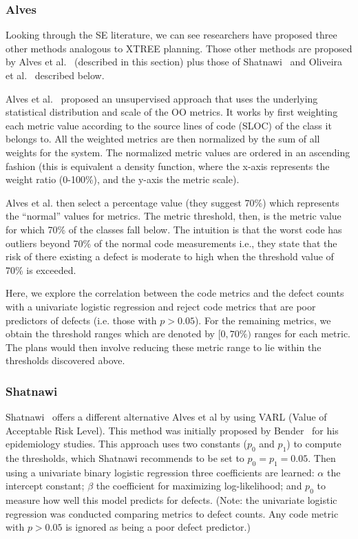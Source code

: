 \documentclass[smallextended]{svjour3}       %
\begin{document}
\subsubsection{Alves}

Looking through the SE literature, we can see researchers have proposed three other methods  analogous to XTREE planning.
Those other methods are proposed by Alves et al.~\cite{alves} (described in this section) plus those of Shatnawi~\cite{shatnawi}
and Oliveira et al.~\cite{oliveira} described below.

Alves et al.~\cite{alves} proposed an unsupervised approach
that uses the underlying statistical 
distribution and scale of the OO metrics. It works by first weighting each metric value according to the source lines of 
code (SLOC) of the class it belongs to. All the weighted metrics are then normalized by the sum of all weights for the system. The normalized metric values are ordered in an ascending fashion (this is
equivalent a density function, where the x-axis represents 
the weight ratio (0-100\%), and the y-axis the metric scale).

Alves et al. then select a percentage value (they suggest 70\%) which 
represents the ``normal'' values for metrics. The metric threshold, then, 
is the metric value for which 70\% of the classes fall below. The 
intuition is that the worst code has outliers beyond 70\% of the normal 
code measurements i.e., they state that the risk of there existing a defect 
is moderate to high when the threshold value of 70\% is exceeded.

Here, we explore the correlation between the code metrics 
and the defect counts with a univariate logistic regression and reject 
code metrics that are poor predictors of defects (i.e.  those with $p > 
0.05$). For the remaining metrics, we obtain the threshold ranges which are denoted by $[0, 70\%)$ ranges for each metric. The plans would then involve reducing these metric range to lie within the thresholds discovered above.

\subsubsection{Shatnawi}

Shatnawi~\cite{shatnawi} offers a different alternative Alves et al by using VARL (Value of Acceptable Risk Level). This method was initially proposed by Bender~\cite{bender99} for his epidemiology studies. This approach uses two constants ($p_0$ and $p_1$) to compute the thresholds, which Shatnawi recommends to be set to $p_0=p_1=0.05$. Then using a univariate binary logistic regression three coefficients are learned:
$\alpha$ the intercept constant;
$\beta$ the coefficient for maximizing log-likelihood;
and $p_0$ to 
measure how well this model predicts for defects. (Note: the univariate 
logistic regression was conducted comparing metrics to defect counts. Any 
code metric with $p>0.05$ is ignored as being a poor defect predictor.)
\end{document}
